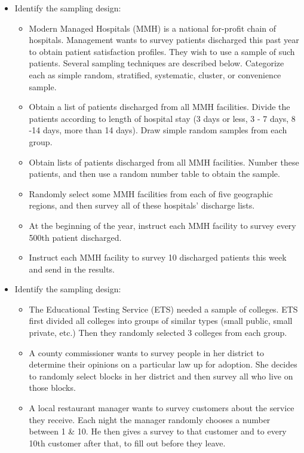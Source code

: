 \documentclass[]{book}
\providecommand{\tightlist}{%
  \setlength{\itemsep}{0pt}\setlength{\parskip}{0pt}}
\begin{document}
\begin{itemize}
\tightlist
\item
  Identify the sampling design:

  \begin{itemize}
  \tightlist
  \item
    Modern Managed Hospitals (MMH) is a national for-profit chain of hospitals. Management wants to survey patients discharged this past year to obtain patient satisfaction profiles. They wish to use a sample of such patients. Several sampling techniques are described below. Categorize each as simple random, stratified,
    systematic, cluster, or convenience sample.
  \item
    Obtain a list of patients discharged from all MMH facilities. Divide the patients according to
    length of hospital stay (3 days or less, 3 - 7 days, 8 -14 days, more than 14 days). Draw simple
    random samples from each group.
  \item
    Obtain lists of patients discharged from all MMH facilities. Number these patients, and then
    use a random number table to obtain the sample.
  \item
    Randomly select some MMH facilities from each of five geographic regions, and then survey all
    of these hospitals' discharge lists.
  \item
    At the beginning of the year, instruct each MMH facility to survey every 500th patient
    discharged.
  \item
    Instruct each MMH facility to survey 10 discharged patients this week and send in the
    results.
  \end{itemize}
\item
  Identify the sampling design:

  \begin{itemize}
  \tightlist
  \item
    The Educational Testing Service (ETS) needed a sample of colleges. ETS first divided all colleges into groups of similar types (small public, small private,
    etc.) Then they randomly selected 3 colleges from each group.
  \item
    A county commissioner wants to survey people in her district to determine their opinions on a particular law up for adoption. She decides to
    randomly select blocks in her district and then survey all who live on those blocks.
  \item
    A local restaurant manager wants to survey customers about the service they receive. Each night the manager randomly chooses a number between 1 \& 10. He then gives a survey to that customer and to every 10th customer after that, to fill out before they leave.
  \end{itemize}
\end{itemize}
\end{document}

